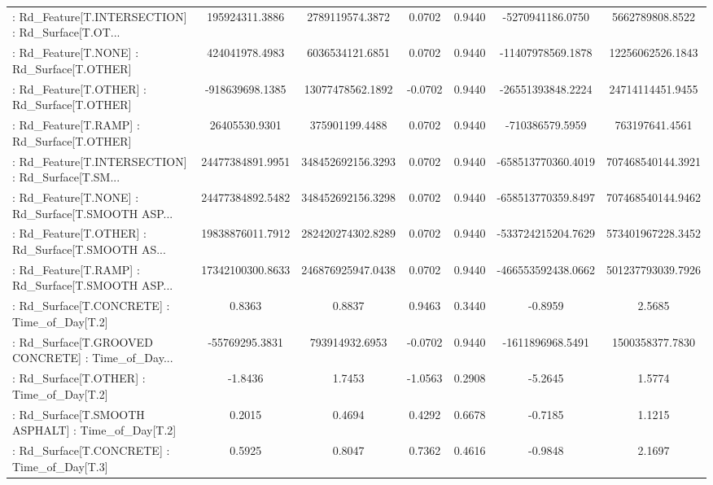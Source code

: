 \begin{longtable}{p{4cm}cccccc}
 : Rd\_Feature[T.INTERSECTION] : Rd\_Surface[T.OT... &    195924311.3886 &   2789119574.3872 &  0.0702 &       0.9440 &   -5270941186.0750 &   5662789808.8522 \\
 : Rd\_Feature[T.NONE] : Rd\_Surface[T.OTHER]        &    424041978.4983 &   6036534121.6851 &  0.0702 &       0.9440 &  -11407978569.1878 &  12256062526.1843 \\
 : Rd\_Feature[T.OTHER] : Rd\_Surface[T.OTHER]       &   -918639698.1385 &  13077478562.1892 & -0.0702 &       0.9440 &  -26551393848.2224 &  24714114451.9455 \\
 : Rd\_Feature[T.RAMP] : Rd\_Surface[T.OTHER]        &     26405530.9301 &    375901199.4488 &  0.0702 &       0.9440 &    -710386579.5959 &    763197641.4561 \\
 : Rd\_Feature[T.INTERSECTION] : Rd\_Surface[T.SM... &  24477384891.9951 & 348452692156.3293 &  0.0702 &       0.9440 & -658513770360.4019 & 707468540144.3921 \\
 : Rd\_Feature[T.NONE] : Rd\_Surface[T.SMOOTH ASP... &  24477384892.5482 & 348452692156.3298 &  0.0702 &       0.9440 & -658513770359.8497 & 707468540144.9462 \\
 : Rd\_Feature[T.OTHER] : Rd\_Surface[T.SMOOTH AS... &  19838876011.7912 & 282420274302.8289 &  0.0702 &       0.9440 & -533724215204.7629 & 573401967228.3452 \\
 : Rd\_Feature[T.RAMP] : Rd\_Surface[T.SMOOTH ASP... &  17342100300.8633 & 246876925947.0438 &  0.0702 &       0.9440 & -466553592438.0662 & 501237793039.7926 \\
 : Rd\_Surface[T.CONCRETE] : Time\_of\_Day[T.2]       &            0.8363 &            0.8837 &  0.9463 &       0.3440 &            -0.8959 &            2.5685 \\
 : Rd\_Surface[T.GROOVED CONCRETE] : Time\_of\_Day... &    -55769295.3831 &    793914932.6953 & -0.0702 &       0.9440 &   -1611896968.5491 &   1500358377.7830 \\
 : Rd\_Surface[T.OTHER] : Time\_of\_Day[T.2]          &           -1.8436 &            1.7453 & -1.0563 &       0.2908 &            -5.2645 &            1.5774 \\
 : Rd\_Surface[T.SMOOTH ASPHALT] : Time\_of\_Day[T.2] &            0.2015 &            0.4694 &  0.4292 &       0.6678 &            -0.7185 &            1.1215 \\
 : Rd\_Surface[T.CONCRETE] : Time\_of\_Day[T.3]       &            0.5925 &            0.8047 &  0.7362 &       0.4616 &            -0.9848 &            2.1697 \\

\end{longtable}
